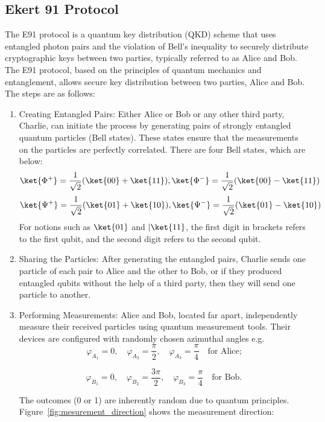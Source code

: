 \documentclass[a4paper]{cas-sc}
\begin{document}
\subsection{Ekert 91 Protocol}
\label{sec:e91}
The E91 protocol is a quantum key distribution (QKD) scheme that uses entangled photon pairs and the violation of Bell's inequality to securely distribute cryptographic keys between two parties, typically referred to as Alice and Bob. The E91 protocol, based on the principles of quantum mechanics and entanglement, allows secure key distribution between two parties, Alice and Bob. The steps are as follows:
\begin{enumerate}
    \item Creating Entangled Pairs: Either Alice or Bob or any other third party, Charlie, can initiate the process by generating pairs of strongly entangled quantum particles (Bell states). These states ensure that the measurements on the particles are perfectly correlated. There are four Bell states, which are below:
          \[\ket{\Phi^{+}}=\frac{1}{\sqrt{2}}(\ket{00}+\ket{11}),\ket{\Phi^{-}}=\frac{1}{\sqrt{2}}(\ket{00}-\ket{11})\]
          \[\ket{\Psi^{+}}=\frac{1}{\sqrt{2}}(\ket{01}+\ket{10}),\ket{\Psi^{-}}=\frac{1}{\sqrt{2}}(\ket{01}-\ket{10})\]
          For notions such as $\ket{01}$ and $|\ket{11}$, the first digit in brackets refers to the first qubit, and the second digit refers to the second qubit.

    \item Sharing the Particles: After generating the entangled pairs, Charlie sends one particle of each pair to Alice and the other to Bob, or if they produced entangled qubits without the help of a third party, then they will send one particle to another.
    \item Performing Measurements: Alice and Bob, located far apart, independently measure their received particles using quantum measurement tools. Their devices are configured with randomly chosen azimuthal angles e.g.  \[
              \varphi_{A_1} = 0, \quad \varphi_{A_2} = \frac{\pi}{2}, \quad \varphi_{A_3} = \frac{\pi}{4} \quad \text{for Alice;}
          \]

          \[
              \varphi_{B_1} = 0, \quad \varphi_{B_2} = \frac{3\pi}{2}, \quad \varphi_{B_3} = \frac{\pi}{4} \quad \text{for Bob.}
          \]

          The outcomes (0 or 1) are inherently random due to quantum principles.
          Figure~\ref{fig:mesurement_direction} shows the measurement direction:


\end{enumerate}
\end{document}

